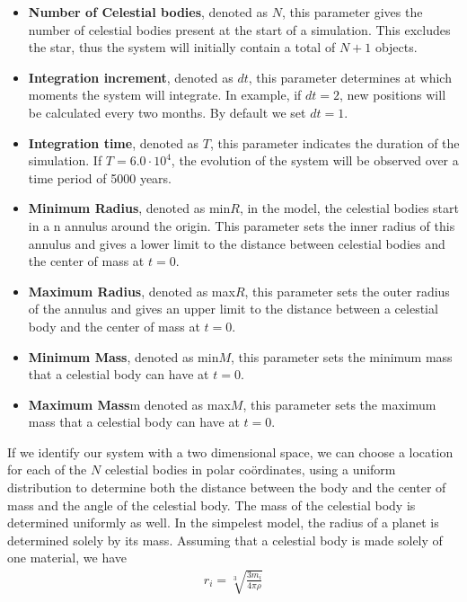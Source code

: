 \begin{itemize}
	\item \textbf{Number of Celestial bodies}, denoted as \(N\), this parameter gives the number of celestial bodies present at the start of a simulation. This excludes the star, thus the system will initially contain a total of \(N+1\) objects.
	\item \textbf{Integration increment}, denoted as \(dt\), this parameter determines at which moments the system will integrate. In example, if \(dt=2\), new positions will be calculated every two months. By default we set \(dt=1\).
	\item \textbf{Integration time}, denoted as \(T\), this parameter indicates the duration of the simulation. If \(T=6.0\cdot10^4\), the evolution of the system will be observed over a time period of 5000 years.
	\item \textbf{Minimum Radius}, denoted as min\(R\), in the model, the celestial bodies start in a n annulus around the origin. This parameter sets the inner radius of this annulus and gives a lower limit to the distance between celestial bodies and the center of mass at \(t=0\).
	\item \textbf{Maximum Radius}, denoted as max\(R\), this parameter sets the outer radius of the annulus and gives an upper limit to the distance between a celestial body and the center of mass at \(t=0\).
	\item \textbf{Minimum Mass}, denoted as min\(M\), this parameter sets the minimum mass that a celestial body can have at \(t=0\).
	\item \textbf{Maximum Mass}m denoted as max\(M\), this parameter sets the maximum mass that a celestial body can have at \(t=0\).
\end{itemize}
If we identify our system with a two dimensional space, we can choose a location for each of the \(N\) celestial bodies in polar co\"ordinates, using a uniform distribution to determine both the distance between the body and the center of mass and the angle of the celestial body. 
The mass of the celestial body is determined uniformly as well. In the simpelest model, the radius of a planet is determined solely by its mass. Assuming that a celestial body is made solely of one material, we have
\begin{align}
r_i=\sqrt[3]{\frac{3 m_i}{4\pi \rho}}\label{eq:rad}
\end{align}
